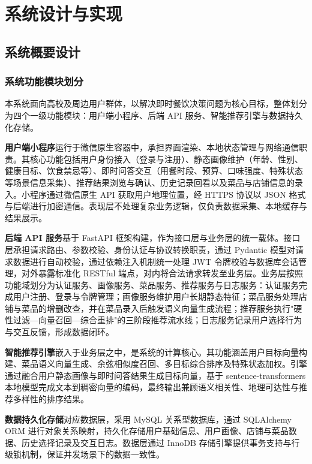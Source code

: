 \chapter{系统设计与实现}

\section{系统概要设计}

\subsection{系统功能模块划分}

本系统面向高校及周边用户群体，以解决即时餐饮决策问题为核心目标，整体划分为四个一级功能模块：用户端小程序、后端 API 服务、智能推荐引擎与数据持久化存储。

\textbf{用户端小程序}运行于微信原生容器中，承担界面渲染、本地状态管理与网络通信职责。其核心功能包括用户身份接入（登录与注册）、静态画像维护（年龄、性别、健康目标、饮食禁忌等）、即时问答交互（用餐时段、预算、口味强度、特殊状态等场景信息采集）、推荐结果浏览与确认、历史记录回看以及菜品与店铺信息的录入。小程序通过微信原生 API 获取用户地理位置，经 HTTPS 协议以 JSON 格式与后端进行加密通信。表现层不处理复杂业务逻辑，仅负责数据采集、本地缓存与结果展示。

\textbf{后端 API 服务}基于 FastAPI 框架构建，作为接口层与业务层的统一载体。接口层承担请求路由、参数校验、身份认证与协议转换职责，通过 Pydantic 模型对请求数据进行自动校验，通过依赖注入机制统一处理 JWT 令牌校验与数据库会话管理，对外暴露标准化 RESTful 端点，对内将合法请求转发至业务层。业务层按照功能域划分为认证服务、画像服务、菜品服务、推荐服务与日志服务：认证服务完成用户注册、登录与令牌管理；画像服务维护用户长期静态特征；菜品服务处理店铺与菜品的增删改查，并在菜品录入后触发语义向量生成流程；推荐服务执行"硬性过滤---向量召回---综合重排"的三阶段推荐流水线；日志服务记录用户选择行为与交互反馈，形成数据闭环。

\textbf{智能推荐引擎}嵌入于业务层之中，是系统的计算核心。其功能涵盖用户目标向量构建、菜品语义向量生成、余弦相似度召回、多目标综合排序及特殊状态加权。引擎通过融合用户静态画像与即时问答结果生成目标向量，基于 sentence-transformers 本地模型完成文本到稠密向量的编码，最终输出兼顾语义相关性、地理可达性与推荐多样性的排序结果。

\textbf{数据持久化存储}对应数据层，采用 MySQL 关系型数据库，通过 SQLAlchemy ORM 进行对象关系映射，持久化存储用户基础信息、用户画像、店铺与菜品数据、历史选择记录及交互日志。数据层通过 InnoDB 存储引擎提供事务支持与行级锁机制，保证并发场景下的数据一致性。

